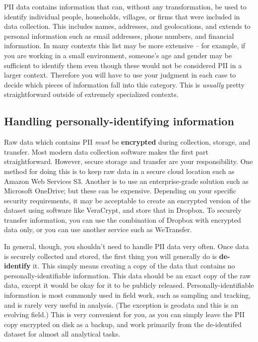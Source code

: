 PII data contains information that can, without any transformation, be used to identify
individual people, households, villages, or firms that were included in data collection.
This includes names, addresses, and geolocations, and extends to personal information
such as email addresses, phone numbers, and financial information.
In many contexts this list may be more extensive --
for example, if you are working in a small environment,
someone's age and gender may be sufficient to identify them
even though these would not be considered PII in a larger context.
Therefore you will have to use your judgment in each case
to decide which pieces of information fall into this category.
This is \textit{usually} pretty straightforward outside of extremely specialized contexts.

\subsection{Handling personally-identifying information}

Raw data which contains PII \textit{must} be \textbf{encrypted}
during collection, storage, and transfer.
Most modern data collection software makes the first part straightforward.
However, secure storage and transfer are your responsibility.
One method for doing this is to keep raw data in a secure cloud location such as Amazon Web Services S3.
Another is to use an enterprise-grade solution such as Microsoft OneDrive; but these can be expensive.
Depending on your specific security requirements,
it may be acceptable to create an encrypted version of the dataset
using software like VeraCrypt, and store that in Dropbox.
To securely transfer information,
you can use the combination of Dropbox with encrypted data only,
or you can use another service such as WeTransfer.

In general, though, you shouldn't need to handle PII data very often.
Once data is securely collected and stored, the first thing you will generally do is \textbf{de-identify} it.
This simply means creating a copy of the data that contains no personally-identifiable information.
This data should be an exact copy of the raw data,
except it would be okay for it to be publicly released.\cite{matthews2011data}
Personally-identifiable information is most commonly used in field work, such as sampling and tracking,
and is rarely very useful in analysis. (The exception is geodata and this is an evolving field.)
This is very convenient for you, as you can simply leave the PII copy encrypted on disk as a backup,
and work primarily from the de-identifed dataset for almost all analytical tasks.


